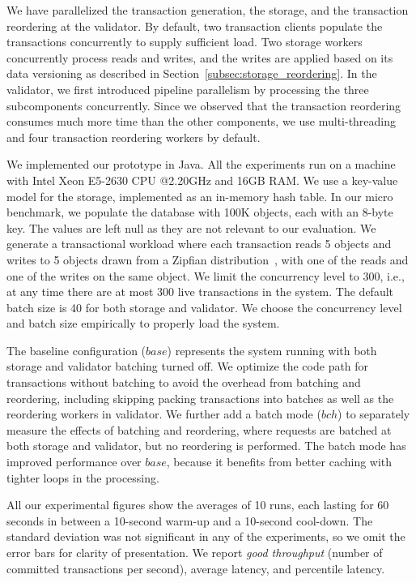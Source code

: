 We have parallelized the transaction generation, the storage, and the transaction reordering at the validator. By default, two transaction clients populate the transactions concurrently to supply sufficient load. Two storage workers concurrently process reads and writes, 
and the writes are applied based on its data versioning as described in Section~\ref{subsec:storage_reordering}. 
In the validator, we first introduced pipeline parallelism by processing the three subcomponents concurrently. Since we observed that the transaction reordering consumes much more time than the other components, we use multi-threading and four transaction reordering workers by default.

We implemented our prototype in Java. All the experiments run on a machine with
Intel Xeon E5-2630 CPU @2.20GHz and 16GB RAM. We use a key-value model for the
storage, implemented as an in-memory hash table. In our micro benchmark, we populate the database with 100K objects, each with an 8-byte key. The values are left null as they are not relevant to our evaluation. We generate a transactional workload where each transaction reads 5 objects and writes to 5 objects drawn from a Zipfian distribution~\cite{gray1994quickly}, with one of the reads and one of the writes on the same object. We limit the concurrency level to 300, i.e., at any time there are at most 300 live transactions in the system. The default batch size is 40 for both storage and validator. We choose the concurrency level and batch size empirically to properly load the system.

The baseline configuration ($base$) represents the system running with both storage and validator batching turned off. We optimize the code path for transactions without batching to avoid the overhead from batching and reordering, including skipping packing transactions into batches as well as the reordering workers in validator. We further add a batch mode ($bch$) to separately measure the effects of batching and reordering, where requests are batched at both storage and validator, but no reordering is performed. The batch mode has improved performance over $base$, because it benefits from better caching with tighter loops in the processing. 

All our experimental figures show the averages of 10 runs, each lasting for 60 seconds in between a 10-second warm-up and a 10-second cool-down. The standard deviation was not significant in any of the experiments, so we omit the error bars for clarity of presentation. We report \emph{good throughput} (number of committed transactions per second), average latency, and percentile latency.

